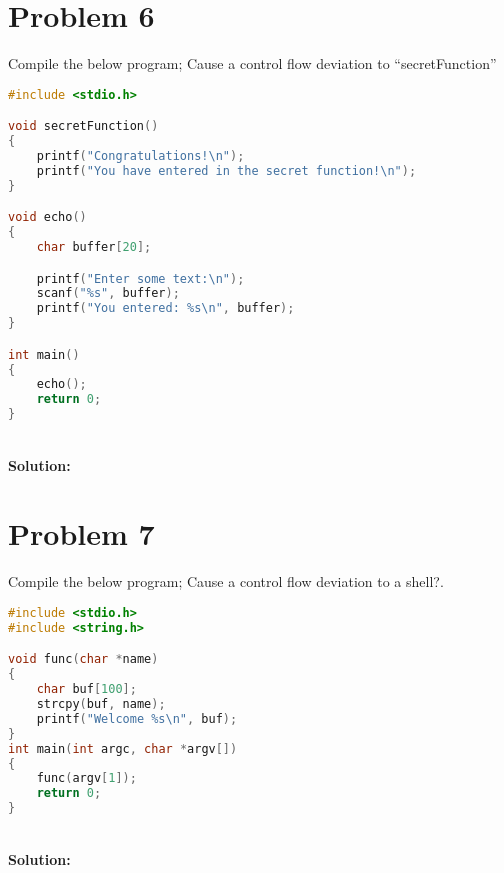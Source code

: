 \documentclass[10.9pt]{article}
\newcommand\tab[1][0.5cm]{\hspace*{#1}}
\begin{document}
\section{Problem 6}
\tab Compile the below program; Cause a control flow deviation to ``secretFunction”

\begin{lstlisting}[language=C]
#include <stdio.h>

void secretFunction()
{
	printf("Congratulations!\n");
	printf("You have entered in the secret function!\n");
}

void echo()
{
	char buffer[20];

	printf("Enter some text:\n");
	scanf("%s", buffer);
	printf("You entered: %s\n", buffer);
}

int main()
{
	echo();
	return 0;
}
\end{lstlisting}


\textbf{\\Solution:\\}



\section{Problem 7}
\tab Compile the below program; Cause a control flow deviation to a shell?.

\begin{lstlisting}[language=C]
#include <stdio.h>
#include <string.h>

void func(char *name)
{
	char buf[100];
	strcpy(buf, name);
	printf("Welcome %s\n", buf);
}
int main(int argc, char *argv[])
{
	func(argv[1]);
	return 0;
}
\end{lstlisting}

\textbf{\\Solution:\\}
\end{document}
